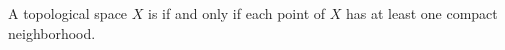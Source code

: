 A topological space $X$ is  if and only if each point of $X$ has at least one compact neighborhood.
